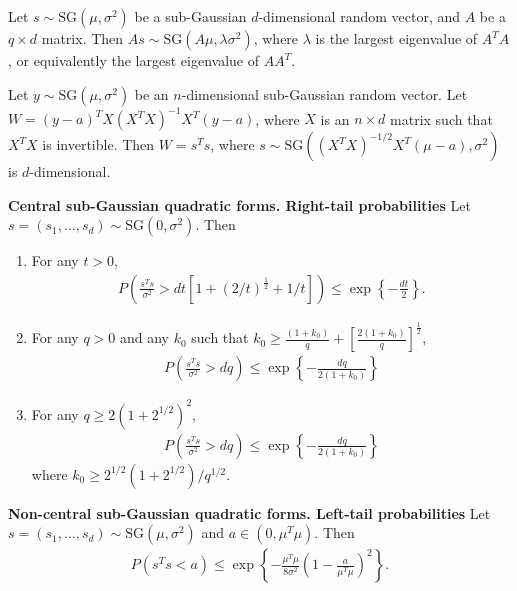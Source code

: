 \begin{lemma}
Let $s \sim \mbox{SG}(\mu, \sigma^2)$ be a sub-Gaussian $d$-dimensional random vector, and $A$ be a $q \times d$ matrix.
Then $As \sim \mbox{SG}(A\mu, \lambda \sigma^2)$, where $\lambda$ is the largest eigenvalue of $A^TA$, or equivalently the largest eigenvalue of $A A^T$.
\label{lem:subgaussian_lincomb}
\end{lemma}



\begin{lemma}
Let $y \sim \mbox{SG}(\mu,\sigma^2)$ be an $n$-dimensional sub-Gaussian random vector.
Let $W= (y-a)^T X (X^T X)^{-1} X^T (y-a)$, where $X$ is an $n \times d$ matrix such that $X^TX$ is invertible.
Then $W= s^T s$, where $s \sim \mbox{SG}((X^TX)^{-1/2} X^T (\mu - a), \sigma^2)$ is $d$-dimensional.
\label{lem:subgaussian_quadform}
\end{lemma}



\begin{lemma} {\bf Central sub-Gaussian quadratic forms. Right-tail probabilities}
Let $s=(s_1,\ldots,s_d) \sim \mbox{SG}(0,\sigma^2)$. Then
\begin{enumerate}[leftmargin=*,label=(\roman*)]
\item For any $t>0$,
\begin{align}
 P \left( \frac{s^Ts}{\sigma^2} > d t [1 + (2/t)^{\frac{1}{2}} + 1/t] \right) \leq \exp\left\{- \frac{dt}{2} \right\}.
\nonumber
\end{align}

\item For any $q>0$ and any $k_0$ such that $k_0 \geq \frac{(1+k_0)}{q} + \left[\frac{2(1+k_0)}{q}\right]^{\frac{1}{2}}$,
\begin{align}
P \left( \frac{ s^T s}{\sigma^2} > dq \right) \leq \exp \left\{  - \frac{d q}{2(1+k_0)} \right\}
\nonumber
\end{align}

\item For any $q \geq 2 (1+2^{1/2})^2$,
\begin{align}
P \left( \frac{ s^T s}{\sigma^2} > dq \right) \leq \exp \left\{  - \frac{d q}{2(1+k_0)} \right\}
\nonumber
\end{align}
where $k_0\geq 2^{1/2}(1+2^{1/2})/q^{1/2}$.
\end{enumerate}
\label{lem:tail_quadform_subgaussian}
\end{lemma}


\begin{lemma} {\bf Non-central sub-Gaussian quadratic forms. Left-tail probabilities}
Let $s=(s_1,\ldots,s_d) \sim \mbox{SG}(\mu,\sigma^2)$ and $a \in (0,\mu^T\mu)$. Then
\begin{align}
 P(s^Ts < a) \leq \exp \left\{ - \frac{\mu^T\mu}{8\sigma^2} \left( 1 - \frac{a}{\mu^T\mu} \right)^2 \right\}.
\nonumber
\end{align}

\label{lem:lefttail_quadform_subgaussian}
\end{lemma}


